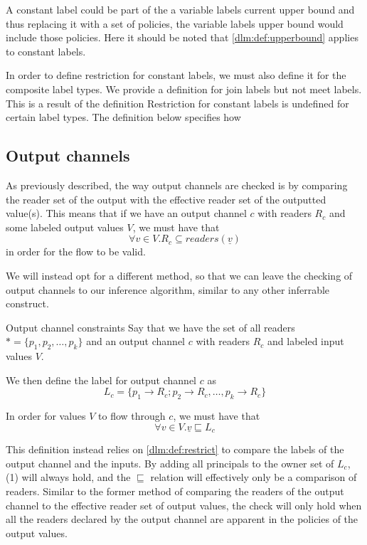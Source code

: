 A constant label could be part of the a variable labels current upper bound and thus replacing it with a set of policies, the variable labels upper bound would include those policies.
Here it should be noted that \cref{dlm:def:upperbound} applies to constant labels.

In order to define restriction for constant labels, we must also define it for the composite label types.
We provide a definition for join labels but not meet labels.
This is a result of the definition
Restriction for constant labels is undefined for certain label types.
The definition below specifies how

\subsection{Output channels}
As previously described, the way output channels are checked is by comparing the reader set of the output with the effective reader set of the outputted value(s).
This means that if we have an output channel $c$ with readers $R_c$ and some labeled output values $V$, we must have that
\[ \forall v \in V.R_c \subseteq readers(\underline{v}) \]
in order for the flow to be valid.

We will instead opt for a different method, so that we can leave the checking of output channels to our inference algorithm, similar to any other inferrable construct.

\begin{definition}{Output channel constraints}
Say that we have the set of all readers $ * = \{p_1, p_2, \dots, p_k\} $ and an output channel $c$ with readers $R_c$ and labeled input values $V$.

We then define the label for output channel $c$ as
\[ L_c = \{ p_1 \rightarrow R_c; p_2 \rightarrow R_c, \dots, p_k \rightarrow R_c \} \]

In order for values $V$ to flow through $c$, we must have that
\[ \forall v \in V.\underline{v} \sqsubseteq L_c \]
\end{definition}

This definition instead relies on \cref{dlm:def:restrict} to compare the labels of the output channel and the inputs.
By adding all principals to the owner set of $L_c$, (1) will always hold, and the $\sqsubseteq$ relation will effectively only be a comparison of readers.
Similar to the former method of comparing the readers of the output channel to the effective reader set of output values, the check will only hold when all the readers declared by the output channel are apparent in the policies of the output values.

